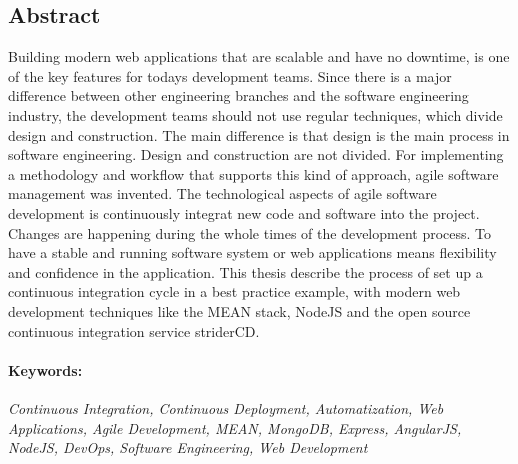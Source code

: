 \subsection*{Abstract}
Building modern web applications that are scalable and have no downtime, is one of the key features for todays development teams. Since there
is a major difference between other engineering branches and the software engineering industry, the development teams should not use
regular techniques, which divide design and construction. The main difference is that design is the main process in
software engineering. Design and construction are not divided. For implementing a methodology and workflow that supports
this kind of approach, agile software management was invented. The technological aspects of agile software development is continuously integrat new code and software into the project. Changes are happening during the whole times of the development process. To have a stable and running
software system or web applications means flexibility and confidence in the application. This thesis describe the process of set up
a continuous integration cycle in a best practice example, with modern web development techniques like the MEAN stack, NodeJS and the open
source continuous integration service striderCD.


\paragraph{Keywords:}
\textit{Continuous Integration, Continuous Deployment, Automatization, Web Applications, Agile Development, MEAN, MongoDB, Express, AngularJS, NodeJS, DevOps, Software Engineering, Web Development}
